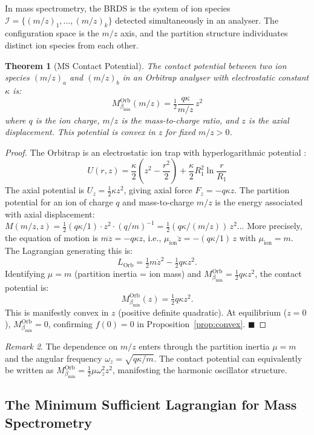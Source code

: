 \documentclass[11pt,twocolumn,a4paper]{article}
\theoremstyle{plain}
\newtheorem{theorem}{Theorem}[section]
\theoremstyle{definition}
\theoremstyle{remark}
\newtheorem{remark}[theorem]{Remark}
\newcommand{\bmin}{\beta_{\min}}
\newcommand{\Ical}{\mathcal{I}}
\newcommand{\half}{\tfrac{1}{2}}
\renewcommand{\qed}{\hfill$\blacksquare$}
\begin{document}
In mass spectrometry, the BRDS is the system of ion species $\Ical = \{(m/z)_1,
\ldots, (m/z)_k\}$ detected simultaneously in an analyser. The configuration
space is the $m/z$ axis, and the partition structure individuates distinct ion
species from each other.

\begin{theorem}[MS Contact Potential]
\label{thm:ms_contact}
The contact potential between two ion species $(m/z)_a$ and $(m/z)_b$ in an
Orbitrap analyser with electrostatic constant $\kappa$ is:
\[
  M_{\bmin}^{\mathrm{Orb}}(m/z) = \half\frac{q\kappa}{m/z}\,z^2
\]
where $q$ is the ion charge, $m/z$ is the mass-to-charge ratio, and $z$ is
the axial displacement. This potential is convex in $z$ for fixed $m/z > 0$.
\end{theorem}

\begin{proof}
The Orbitrap is an electrostatic ion trap with hyperlogarithmic potential
\citep{makarov2000performance}:
\[
  U(r, z) = \frac{\kappa}{2}\left(z^2 - \frac{r^2}{2}\right) + \frac{\kappa}{2}R_1^2\ln\frac{r}{R_1}
\]
The axial potential is $U_z = \half\kappa z^2$, giving axial force $F_z = -q\kappa z$.
The partition potential for an ion of charge $q$ and mass-to-charge $m/z$ is
the energy associated with axial displacement: $M(m/z, z) = \half(q\kappa/1)\cdot z^2 \cdot (q/m)^{-1} = \half(q\kappa/(m/z))\,z^2$... More precisely, the equation of motion is $m\ddot{z} = -q\kappa z$, i.e., $\mu_{\mathrm{ion}}\ddot{z} = -(q\kappa/1)\,z$ with $\mu_{\mathrm{ion}} = m$. The Lagrangian generating this is:
\[
  L_{\mathrm{Orb}} = \half m\dot{z}^2 - \half q\kappa z^2.
\]
Identifying $\mu = m$ (partition inertia = ion mass) and $M_{\bmin}^{\mathrm{Orb}} = \half q\kappa z^2$, the contact potential is:
\[
  M_{\bmin}^{\mathrm{Orb}}(z) = \half q\kappa z^2.
\]
This is manifestly convex in $z$ (positive definite quadratic). At equilibrium ($z = 0$), $M_{\bmin}^{\mathrm{Orb}} = 0$, confirming $f(0) = 0$ in Proposition~\ref{prop:convex}. \qed
\end{proof}

\begin{remark}
The dependence on $m/z$ enters through the partition inertia $\mu = m$ and the angular frequency $\omega_z = \sqrt{q\kappa/m}$. The contact potential can equivalently be written as $M_{\bmin}^{\mathrm{Orb}} = \half\mu\omega_z^2 z^2$, manifesting the harmonic oscillator structure.
\end{remark}

\subsection{The Minimum Sufficient Lagrangian for Mass Spectrometry}
\end{document}
